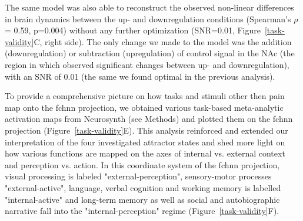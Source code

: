 \documentclass{article}
\begin{document}
The same model was also able to reconstruct the observed non-linear differences in brain dynamics between the up- and downregulation conditions (Spearman's $\rho$ = 0.59, p=0.004) without any further optimization (SNR=0.01,
Figure~\ref{task-validity}C, right side). The only change we made to the model was the addition (downregulation) or
subtraction (upregulation) of control signal in the NAc (the region in which \citep{woo2015distinct} observed significant changes between up- and downregulation), with an SNR of 0.01 (the same we found optimal in the previous analysis).



To provide a comprehensive picture on how tasks and stimuli other then pain map onto the \acrshort{fchnn} projection, we obtained various task-based meta-analytic activation maps from Neurosynth (see Methods) and plotted them on the \acrshort{fchnn} projection (Figure~\ref{task-validity}E). This analysis reinforced and extended our interpretation of the four investigated attractor states and shed more light on how various functions are mapped on the axes of internal vs. external context and perception vs. action.
In this coordinate system of the \acrshort{fchnn} projection, visual processing is labeled "external-perception", sensory-motor processes "external-active", language, verbal cognition and working memory is labelled "internal-active" and long-term memory as well as social and autobiographic narrative fall into the "internal-perception" regime (Figure~\ref{task-validity}F).

\end{document}

